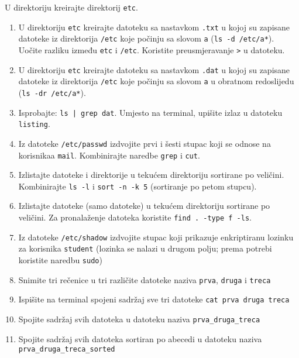 \begin{zadatak} 
U direktoriju kreirajte direktorij \texttt{etc}.

\begin{enumerate}
\item U direktoriju \texttt{etc} kreirajte datoteku sa nastavkom \texttt{.txt} u kojoj su zapisane datoteke iz direktorija \texttt{/etc} koje počinju sa slovom \texttt{a} (\texttt{ls -d /etc/a*}). Uočite razliku između \texttt{etc} i \texttt{/etc}. Koristite preusmjeravanje \texttt{>} u datoteku. 
\item U direktoriju \texttt{etc} kreirajte datoteku sa nastavkom \texttt{.dat} u kojoj su zapisane datoteke iz direktorija \texttt{/etc} koje počinju sa slovom \texttt{a} u obratnom redoslijedu (\texttt{ls -dr /etc/a*}). 

\item Isprobajte: \lstinline!ls | grep dat!. Umjesto na terminal, upišite izlaz u datoteku \texttt{listing}.
\item Iz datoteke \texttt{/etc/passwd} izdvojite prvi i šesti stupac koji se odnose na korisnikaa \texttt{mail}. Kombinirajte naredbe \texttt{grep} i \texttt{cut}.
\item Izlistajte datoteke i direktorije u tekućem direktoriju sortirane po veličini. Kombinirajte \lstinline!ls -l! i \lstinline!sort -n -k 5! (sortiranje po petom stupcu).
\item Izlistajte datoteke (samo datoteke) u tekućem direktoriju sortirane po veličini. Za pronalaženje datoteka koristite \lstinline!find . -type f -ls!.

\item Iz datoteke \texttt{/etc/shadow} izdvojite stupac koji prikazuje enkriptiranu lozinku za korisnika \texttt{student} (lozinka se nalazi u drugom polju; prema potrebi koristite naredbu \texttt{sudo})

\item Snimite tri rečenice u tri različite datoteke naziva \texttt{prva}, \texttt{druga} i \texttt{treca}
\item Ispišite na terminal spojeni sadržaj sve tri datoteke \lstinline!cat prva druga treca!
\item Spojite sadržaj svih datoteka u datoteku naziva \texttt{prva\_druga\_treca}
\item Spojite sadržaj svih datoteka sortiran po abecedi u datoteku naziva \texttt{prva\_druga\_treca\_sorted}
\end{enumerate}
\end{zadatak}
